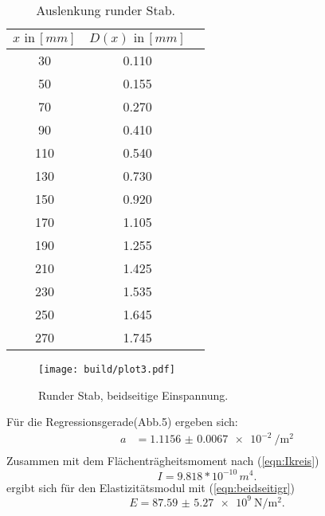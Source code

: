 \begin{table}[h]
  \centering
  \label{tab:lit3}
  \begin{tabular}{ c c c }
    \toprule
    $x \,\, \text{in} \, [mm]$
   &{$D(x) \,\, \text{in} \, [mm]$}\\

    \midrule
    30  & 0.110 & \\%
    50  & 0.155 & \\%
    70  & 0.270 & \\%
    90  & 0.410 & \\%
    110 & 0.540 & \\%
    130 & 0.730 & \\%
    150 & 0.920 & \\%
    170 & 1.105 & \\%
    190 & 1.255 & \\%
    210 & 1.425 & \\%
    230 & 1.535 & \\%
    250 & 1.645 & \\%
    270 & 1.745 & \\%

    \bottomrule
  \end{tabular}
  \caption{Auslenkung runder Stab.}
\end{table}

\begin{figure}
  \centering
  \texttt{[image: build/plot3.pdf]}
  \caption{Runder Stab, beidseitige Einspannung.}
  \label{fig:plot3}
\end{figure}
Für die Regressionsgerade(Abb.5) ergeben sich:
\begin{align*}
  a &= \SI{1.1156(67)e-2}{\per\square\meter} \\
\end{align*}
Zusammen mit dem Flächenträgheitsmoment  nach (\ref{eqn:Ikreis})
\begin{equation*}
  I = 9.818*10^{-10}\, m^4.
\end{equation*}
ergibt sich für den Elastizitätsmodul mit (\ref{eqn:beidseitigr})
\begin{equation*}
  E = \SI{87.59(527)e9}{\newton\per\square\meter} .
\end{equation*}
\newpage
